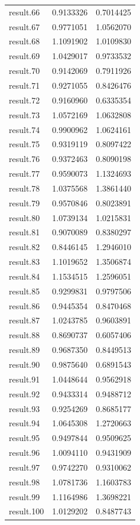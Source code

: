 \documentclass[
  letterpaper,
  DIV=11,
  numbers=noendperiod]{scrreprt}
\begin{document}
\begin{longtable}[]{@{}lrr@{}}
result.66 & 0.9133326 & 0.7014425 \\
result.67 & 0.9771051 & 1.0562070 \\
result.68 & 1.1091902 & 1.0109830 \\
result.69 & 1.0429017 & 0.9733532 \\
result.70 & 0.9142069 & 0.7911926 \\
result.71 & 0.9271055 & 0.8426476 \\
result.72 & 0.9160960 & 0.6335354 \\
result.73 & 1.0572169 & 1.0632808 \\
result.74 & 0.9900962 & 1.0624161 \\
result.75 & 0.9319119 & 0.8097422 \\
result.76 & 0.9372463 & 0.8090198 \\
result.77 & 0.9590073 & 1.1324693 \\
result.78 & 1.0375568 & 1.3861440 \\
result.79 & 0.9570846 & 0.8023891 \\
result.80 & 1.0739134 & 1.0215831 \\
result.81 & 0.9070089 & 0.8380297 \\
result.82 & 0.8446145 & 1.2946010 \\
result.83 & 1.1019652 & 1.3506874 \\
result.84 & 1.1534515 & 1.2596051 \\
result.85 & 0.9299831 & 0.9797506 \\
result.86 & 0.9445354 & 0.8470468 \\
result.87 & 1.0243785 & 0.9603891 \\
result.88 & 0.8690737 & 0.6057406 \\
result.89 & 0.9687350 & 0.8449513 \\
result.90 & 0.9875640 & 0.6891543 \\
result.91 & 1.0448644 & 0.9562918 \\
result.92 & 0.9433314 & 0.9488712 \\
result.93 & 0.9254269 & 0.8685177 \\
result.94 & 1.0645308 & 1.2720663 \\
result.95 & 0.9497844 & 0.9509625 \\
result.96 & 1.0094110 & 0.9431909 \\
result.97 & 0.9742270 & 0.9310062 \\
result.98 & 1.0781736 & 1.1603783 \\
result.99 & 1.1164986 & 1.3698221 \\
result.100 & 1.0129202 & 0.8487743 \\
\end{longtable}
\end{document}
